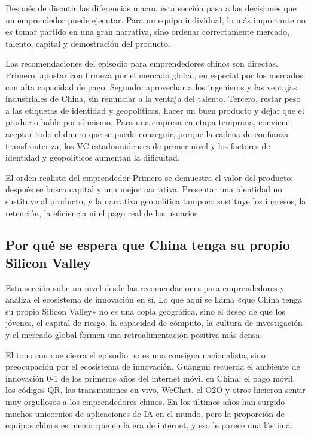 \documentclass[a4paper]{article}
\begin{document}
Después de discutir las diferencias macro, esta sección pasa a las decisiones que un emprendedor puede ejecutar. Para un equipo individual, lo más importante no es tomar partido en una gran narrativa, sino ordenar correctamente mercado, talento, capital y demostración del producto.

Las recomendaciones del episodio para emprendedores chinos son directas. Primero, apostar con firmeza por el mercado global, en especial por los mercados con alta capacidad de pago. Segundo, aprovechar a los ingenieros y las ventajas industriales de China, sin renunciar a la ventaja del talento. Tercero, restar peso a las etiquetas de identidad y geopolíticas, hacer un buen producto y dejar que el producto hable por sí mismo. Para una empresa en etapa temprana, conviene aceptar todo el dinero que se pueda conseguir, porque la cadena de confianza transfronteriza, los VC estadounidenses de primer nivel y los factores de identidad y geopolíticos aumentan la dificultad.

\begin{importantbox}{El orden realista del emprendedor}
Primero se demuestra el valor del producto; después se busca capital y una mejor narrativa. Presentar una identidad no sustituye al producto, y la narrativa geopolítica tampoco sustituye los ingresos, la retención, la eficiencia ni el pago real de los usuarios.
\end{importantbox}

\subsection{Por qué se espera que China tenga su propio Silicon Valley}

Esta sección sube un nivel desde las recomendaciones para emprendedores y analiza el ecosistema de innovación en sí. Lo que aquí se llama «que China tenga su propio Silicon Valley» no es una copia geográfica, sino el deseo de que los jóvenes, el capital de riesgo, la capacidad de cómputo, la cultura de investigación y el mercado global formen una retroalimentación positiva más densa.

El tono con que cierra el episodio no es una consigna nacionalista, sino preocupación por el ecosistema de innovación. Guangmi recuerda el ambiente de innovación 0-1 de los primeros años del internet móvil en China: el pago móvil, los códigos QR, las transmisiones en vivo, WeChat, el O2O y otros hicieron sentir muy orgullosos a los emprendedores chinos. En los últimos años han surgido muchos unicornios de aplicaciones de IA en el mundo, pero la proporción de equipos chinos es menor que en la era de internet, y eso le parece una lástima.
\end{document}
